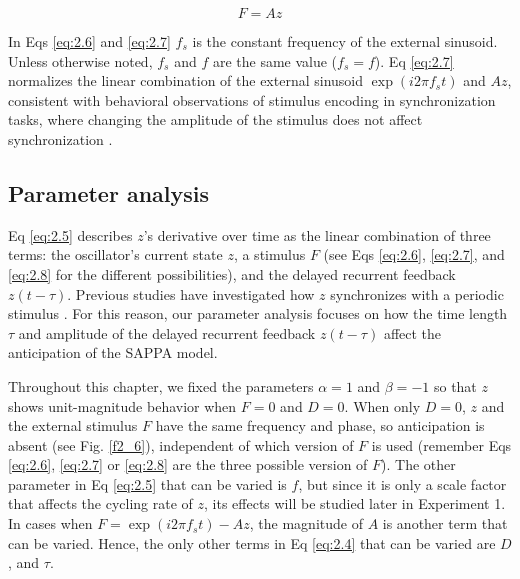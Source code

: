 \documentclass{report}
\begin{document}
\begin{equation}
F = Az \label{eq:2.8}
\end{equation}

In Eqs \eqref{eq:2.6} and \eqref{eq:2.7} $f_s$ is the constant frequency of the external sinusoid. Unless otherwise noted, $f_s$ and $f$ are the same value ($f_s = f$). Eq \eqref{eq:2.7} normalizes the linear combination of the external sinusoid $\exp(i2\pi f_s t)$ and $Az$, consistent with behavioral observations of stimulus encoding in synchronization tasks, where changing the amplitude of the stimulus does not affect synchronization \cite{repp2008metrical}.

\subsection{Parameter analysis}

Eq \eqref{eq:2.5} describes $z$'s derivative over time as the linear combination of three terms: the oscillator's current state $z$, a stimulus $F$ (see Eqs \eqref{eq:2.6}, \eqref{eq:2.7}, and \eqref{eq:2.8} for the different possibilities), and the delayed recurrent feedback $z(t - \tau)$. Previous studies have investigated how $z$ synchronizes with a periodic stimulus \cite{kim2015signal, large2008resonating}. For this reason, our parameter analysis focuses on how the time length $\tau$ and amplitude of the delayed recurrent feedback $z(t - \tau)$ affect the anticipation of the SAPPA model.

Throughout this chapter, we fixed the parameters $\alpha = 1$ and $\beta = -1$ so that $z$ shows unit-magnitude behavior when $F = 0$ and $D = 0$. When only $D = 0$, $z$ and the external stimulus $F$ have the same frequency and phase, so anticipation is absent (see Fig.{} \ref{f2_6}), independent of which version of $F$ is used (remember Eqs \eqref{eq:2.6}, \eqref{eq:2.7} or \eqref{eq:2.8} are the three possible version of $F$). The other parameter in Eq \eqref{eq:2.5} that can be varied is $f$, but since it is only a scale factor that affects the cycling rate of $z$, its effects will be studied later in Experiment 1. In cases when $F = \exp(i2\pi f_s t)−Az$, the magnitude of $A$ is another term that can be varied. Hence, the only other terms in Eq \eqref{eq:2.4} that can be varied are $D$, and $\tau$.
\end{document}
